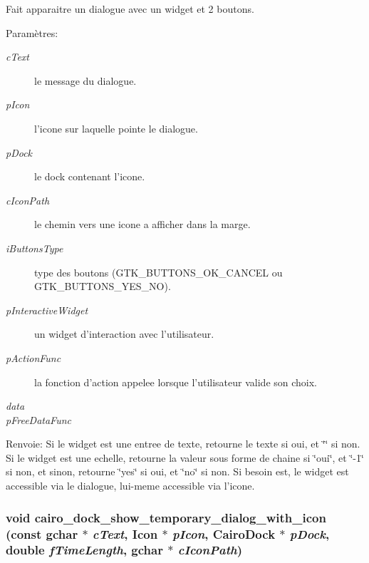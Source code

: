 Fait apparaitre un dialogue avec un widget et 2 boutons. \begin{Desc}
\item[Param\`{e}tres:]
\begin{description}
\item[{\em c\-Text}]le message du dialogue. \item[{\em p\-Icon}]l'icone sur laquelle pointe le dialogue. \item[{\em p\-Dock}]le dock contenant l'icone. \item[{\em c\-Icon\-Path}]le chemin vers une icone a afficher dans la marge. \item[{\em i\-Buttons\-Type}]type des boutons (GTK\_\-BUTTONS\_\-OK\_\-CANCEL ou GTK\_\-BUTTONS\_\-YES\_\-NO). \item[{\em p\-Interactive\-Widget}]un widget d'interaction avec l'utilisateur. \item[{\em p\-Action\-Func}]la fonction d'action appelee lorsque l'utilisateur valide son choix. \item[{\em data}]\item[{\em p\-Free\-Data\-Func}]\end{description}
\end{Desc}
\begin{Desc}
\item[Renvoie:]Si le widget est une entree de texte, retourne le texte si oui, et \char`\"{}\char`\"{} si non. Si le widget est une echelle, retourne la valeur sous forme de chaine si \char`\"{}oui\char`\"{}, et \char`\"{}-1\char`\"{} si non, et sinon, retourne \char`\"{}yes\char`\"{} si oui, et \char`\"{}no\char`\"{} si non. Si besoin est, le widget est accessible via le dialogue, lui-meme accessible via l'icone. \end{Desc}
\subsubsection{\setlength{\rightskip}{0pt plus 5cm}void cairo\_\-dock\_\-show\_\-temporary\_\-dialog\_\-with\_\-icon (const gchar $\ast$ {\em c\-Text}, {\bf Icon} $\ast$ {\em p\-Icon}, {\bf Cairo\-Dock} $\ast$ {\em p\-Dock}, double {\em f\-Time\-Length}, gchar $\ast$ {\em c\-Icon\-Path})}\label{cairo-dock-dialogs_8c_ccf3e234a392599fb75ce236471d7729}



